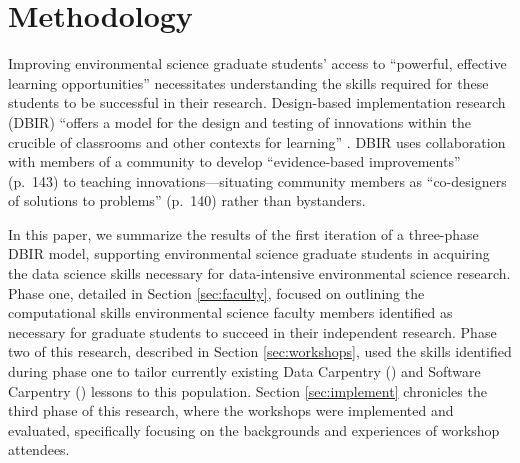 \documentclass[12pt]{article}
\begin{document}

\section{Methodology}

\noindent Improving environmental science graduate students' access to 
``powerful, effective learning opportunities'' \citep[p.\ 137]{penuel}
necessitates understanding the skills required for these students to be
successful in their research. Design-based implementation research (DBIR) 
\citep{confrey, penuel, oneill} ``offers a model for the design and testing of
innovations within the crucible of classrooms and other contexts for learning'' 
\citep[p.\ 140]{penuel}. DBIR uses collaboration with members of a
community to develop ``evidence-based improvements'' (p.\ 143) to teaching 
innovations---situating community members as ``co-designers of solutions to 
problems'' (p.\ 140) rather than bystanders. 

\quad In this paper, we summarize the results of the first iteration of a
three-phase DBIR model, supporting environmental science graduate students in
acquiring the data science skills necessary for data-intensive environmental 
science research. Phase one, detailed in Section \ref{sec:faculty}, focused on
outlining the computational skills environmental science faculty members
identified as necessary for graduate students to succeed in their independent
research. Phase two of this research, described in Section \ref{sec:workshops},
used the skills identified during phase one to tailor currently existing Data 
Carpentry (\citeyear{data-carpentry}) and Software Carpentry 
(\citeyear{software-carpentry}) lessons to this population. Section 
\ref{sec:implement} chronicles the third phase of this research, where the 
workshops were implemented and evaluated, specifically focusing on the
backgrounds and experiences of workshop attendees. 

\end{document}
